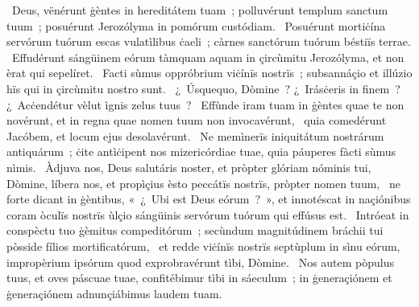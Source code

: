 ~Deus, vënérunt ġèntes in hereditátem tuam~; polluvérunt templum sanctum tuum~; posuérunt Jerozólyma in pomórum custódiam. 
~Posuérunt mortiċína servórum tuórum escas vulatìlibus ċaeli~; càrnes sanctórum tuórum béstiïs terrae. 
~Effudérunt sángüinem eórum tàmquam aquam in çircùmitu Jerozólyma, et non èrat qui sepelíret. 
~Facti sùmus oppróbrium viċínïs nostrïs~; subsannáçio et illúzio hïs qui in çircùmitu nostro sunt. 
~¿~Úsquequo, Dòmine~? ¿~Irásċeris in finem~? ¿~Acċendétur vèlut ìgnis zelus tuus~? 
~Effùnde iram tuam in ġèntes quae te non novérunt, et in regna quae nomen tuum non invocavérunt, 
~quia comedérunt Jacóbem, et locum ejus desolavérunt. 
~Ne memìnerïs iniquitátum nostrárum antiquárum~; ċite antìċipent nos mizericórdiae tuae, quia páuperes fàcti sùmus nìmis. 
~Àdjuva nos, Deus salutáris noster, et pròpter glóriam nóminis tui, Dòmine, líbera nos, et propìçius èsto peccátïs nostrïs, pròpter nomen tuum, 
~ne forte dicant in ġèntibus, «~¿~Ubi est Deus eórum~?~», et innotéscat in naçiónibus coram òculïs nostrïs ùlçio sángüinis servórum tuórum qui effúsus est. 
~Intróeat in conspèctu tuo ġèmitus compeditórum~; secùndum magnitúdinem bráchii tui pòsside fílios mortificatórum, 
~et redde viċínïs nostrïs septùplum in sìnu eórum, impropèrium ipsórum quod exprobravérunt tìbi, Dòmine. 
~Nos autem pòpulus tuus, et oves páscuae tuae, confitébimur tìbi in sáeculum~; in ġeneraçiónem et ġeneraçiónem adnunçiábimus laudem tuam. 
